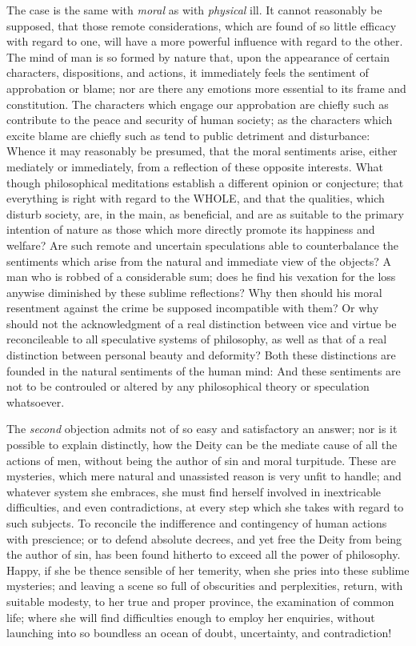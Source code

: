 \documentclass[]{article}
\begin{document}
\begin{sectionbody}
\humeparagraph  The case is the same with \emph{moral} as with \emph{physical} ill. It cannot reasonably be supposed, that those remote considerations, which are found of so little efficacy with regard to one, will have a more powerful influence with regard to the other. The mind of man is so formed by nature that, upon the appearance of certain characters, dispositions, and actions, it immediately feels the sentiment of approbation or blame; nor are there any emotions more essential to its frame and constitution. The characters which engage our approbation are chiefly such as contribute to the peace and security of human society; as the characters which excite blame are chiefly such as tend to public detriment and disturbance: Whence it may reasonably be presumed, that the moral sentiments arise, either mediately or immediately, from a reflection of these opposite interests. What though philosophical meditations establish a different opinion or conjecture; that everything is right with regard to the WHOLE, and that the qualities, which disturb society, are, in the main, as beneficial, and are as suitable to the primary intention of nature as those which more directly promote its happiness and welfare? Are such remote and uncertain speculations able to counterbalance the sentiments which arise from the natural and immediate view of the objects? A man who is robbed of a considerable sum; does he find his vexation for the loss anywise diminished by these sublime reflections? Why then should his moral resentment against the crime be supposed incompatible with them? Or why should not the acknowledgment of a real distinction between vice and virtue be reconcileable to all speculative systems of philosophy, as well as that of a real distinction between personal beauty and deformity? Both these distinctions are founded in the natural sentiments of the human mind: And these sentiments are not to be controuled or altered by any philosophical theory or speculation whatsoever.

\humeparagraph  The \emph{second} objection admits not of so easy and satisfactory an answer; nor is it possible to explain distinctly, how the Deity can be the mediate cause of all the actions of men, without being the author of sin and moral turpitude. These are mysteries, which mere natural and unassisted reason is very unfit to handle; and whatever system she embraces, she must find herself involved in inextricable difficulties, and even contradictions, at every step which she takes with regard to such subjects. To reconcile the indifference and contingency of human actions with prescience; or to defend absolute decrees, and yet free the Deity from being the author of sin, has been found hitherto to exceed all the power of philosophy. Happy, if she be thence sensible of her temerity, when she pries into these sublime mysteries; and leaving a scene so full of obscurities and perplexities, return, with suitable modesty, to her true and proper province, the examination of common life; where she will find difficulties enough to employ her enquiries, without launching into so boundless an ocean of doubt, uncertainty, and contradiction!

\end{sectionbody}
\end{document}
